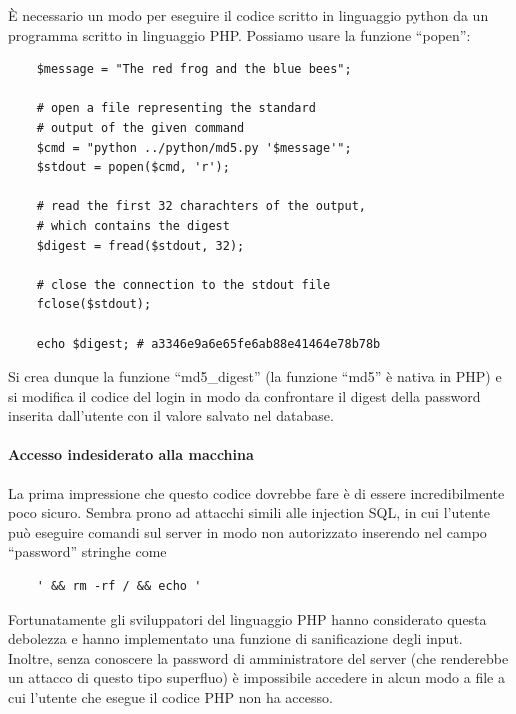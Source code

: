 \documentclass{article}
\begin{document}
È necessario un modo per eseguire il codice scritto in linguaggio python da un programma scritto in linguaggio PHP. Possiamo usare la funzione ``popen'':
\lstset{language=php}
\begin{lstlisting}
    $message = "The red frog and the blue bees";

    # open a file representing the standard 
    # output of the given command
    $cmd = "python ../python/md5.py '$message'";
    $stdout = popen($cmd, 'r');
    
    # read the first 32 charachters of the output,
    # which contains the digest
    $digest = fread($stdout, 32);

    # close the connection to the stdout file
    fclose($stdout);

    echo $digest; # a3346e9a6e65fe6ab88e41464e78b78b
\end{lstlisting}

Si crea dunque la funzione ``md5\_digest'' (la funzione ``md5'' è nativa in PHP) e si modifica il codice del login in modo da confrontare il digest della password inserita dall'utente con il valore salvato nel database.

\paragraph{Accesso indesiderato alla macchina}
La prima impressione che questo codice dovrebbe fare è di essere incredibilmente poco sicuro. Sembra prono ad attacchi simili alle injection SQL, in cui l'utente può eseguire comandi sul server in modo non autorizzato inserendo nel campo ``password'' stringhe come
\begin{verbatim}
    ' && rm -rf / && echo '
\end{verbatim}

Fortunatamente gli sviluppatori del linguaggio PHP hanno considerato questa debolezza e hanno implementato una funzione di sanificazione degli input. Inoltre, senza conoscere la password di amministratore del server (che renderebbe un attacco di questo tipo superfluo) è impossibile accedere in alcun modo a file a cui l'utente che esegue il codice PHP non ha accesso.
\end{document}
